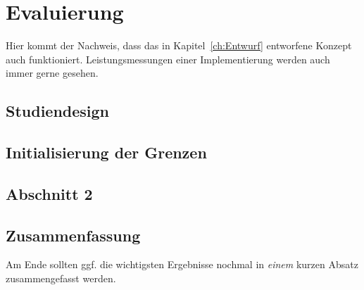 
\chapter{Evaluierung}
\label{ch:Evaluierung}
Hier kommt der Nachweis, dass das in Kapitel~\ref{ch:Entwurf}
entworfene Konzept auch funktioniert. Leistungsmessungen einer
Implementierung werden auch immer gerne gesehen.


\section{Studiendesign}
\label{ch:Implementierung:sec:Studiendesign}







\section{Initialisierung der Grenzen}
\label{ch:Evaluierung:sec:Abschnitt1}



\section{Abschnitt 2}
\label{ch:Evaluierung:sec:Abschnitt2}



\section{Zusammenfassung}
\label{ch:Evaluierung:sec:zusammenfassung}

Am Ende sollten ggf. die wichtigsten Ergebnisse nochmal in \emph{einem}
kurzen Absatz zusammengefasst werden.

